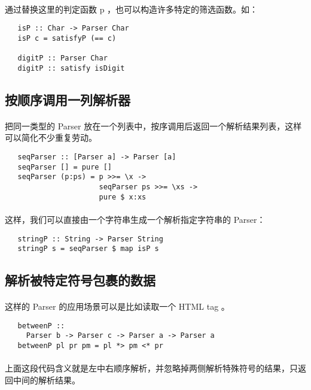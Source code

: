\documentclass{article}
\begin{document}
   \paragraph{}
    通过替换这里的判定函数 p ，也可以构造许多特定的筛选函数。如：
   \begin{lstlisting}
   isP :: Char -> Parser Char
   isP c = satisfyP (== c)
   
   digitP :: Parser Char
   digitP :: satisfy isDigit
   \end{lstlisting}
  
  \subsection{按顺序调用一列解析器}
   \paragraph{}
    把同一类型的 Parser 放在一个列表中，按序调用后返回一个解析结果列表，这样可以简化不少重复劳动。
   \begin{lstlisting}
   seqParser :: [Parser a] -> Parser [a]
   seqParser [] = pure []
   seqParser (p:ps) = p >>= \x ->
                      seqParser ps >>= \xs ->
                      pure $ x:xs
   \end{lstlisting}
   \paragraph{}
    这样，我们可以直接由一个字符串生成一个解析指定字符串的 Parser：
   \begin{lstlisting}
   stringP :: String -> Parser String
   stringP s = seqParser $ map isP s
   \end{lstlisting}
  \subsection{解析被特定符号包裹的数据}
   \paragraph{}
    这样的 Parser 的应用场景可以是比如读取一个 HTML tag 。
   \begin{lstlisting}
   betweenP :: 
     Parser b -> Parser c -> Parser a -> Parser a
   betweenP pl pr pm = pl *> pm <* pr
   \end{lstlisting}
   \paragraph{}
    上面这段代码含义就是左中右顺序解析，并忽略掉两侧解析特殊符号的结果，只返回中间的解析结果。
\end{document}
